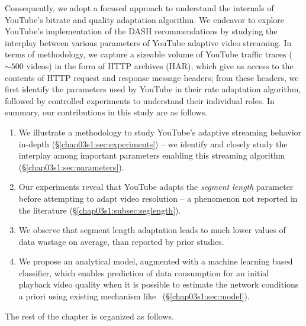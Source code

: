 Consequently, we adopt a focused approach to understand the internals of YouTube's bitrate and quality adaptation algorithm.
We endeavor to explore YouTube's implementation of the DASH recommendations by studying the interplay between various parameters of YouTube adaptive video streaming.
In terms of methodology, we capture a sizeable volume of YouTube traffic traces ($\sim500$ videos) in the form of HTTP archives (HAR), which give us access to the contents of HTTP request and response message headers;
from these headers, we first identify the parameters used by YouTube in their rate adaptation algorithm, followed by controlled experiments to understand their individual roles. In summary, our contributions in this study are as follows.
\begin{enumerate}
	\item We illustrate a methodology to study YouTube's adaptive streaming behavior in-depth (\S\ref{chap03s1:sec:experiments}) -- we identify and closely study the interplay among important parameters enabling this streaming algorithm (\S\ref{chap03s1:sec:parameters}).
	\item Our experiments reveal that YouTube adapts the {\it segment length} parameter before attempting to adapt video resolution -- a phenomenon not reported in the literature (\S\ref{chap03s1:subsec:seglength}).
	\item We observe that segment length adaptation leads to much lower values of data wastage on average, than reported by prior studies.
	\item We propose an analytical model, augmented with a machine learning based classifier, which enables prediction of data consumption for an initial playback video quality when it is possible to estimate the network conditions a priori using existing mechanism like~\cite{Zou2015}  (\S\ref{chap03s1:sec:model}).
\end{enumerate}

The rest of the chapter is organized as follows.  



